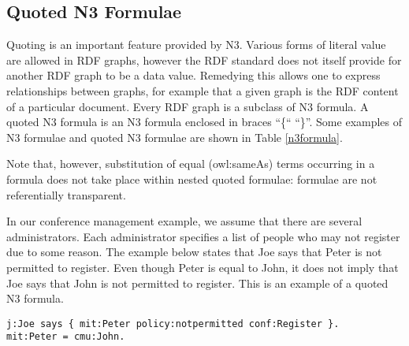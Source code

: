 \documentclass{tlp}
\begin{document}
\subsection{Quoted N3 Formulae}


Quoting is an important feature provided by N3.  Various forms of
literal value are allowed in RDF graphs, however the RDF standard does
not itself provide for another RDF graph to be a data value. Remedying
this allows one to express relationships between graphs, for example
that a given graph is the RDF content of a particular document. Every
RDF graph is a subclass of N3 formula. A quoted N3 formula is an N3
formula enclosed in braces ``\{`` ``\}''. Some examples of N3 formulae and
quoted N3 formulae are shown in Table \ref{n3formula}.



Note that, however, substitution of equal (owl:sameAs) terms occurring
in a formula does not take place within nested quoted formulae:
formulae are not referentially transparent.

In our conference management example, we assume that there are several
administrators. Each administrator specifies a list of people who may
not register due to some reason. The example below states that Joe
says that Peter is not permitted to register. Even though Peter is
equal to John, it does not imply that Joe says that John is not
permitted to register. This is an example of a quoted N3 formula.

\begin{verbatim}
j:Joe says { mit:Peter policy:notpermitted conf:Register }.
mit:Peter = cmu:John.
\end{verbatim}
\end{document}
